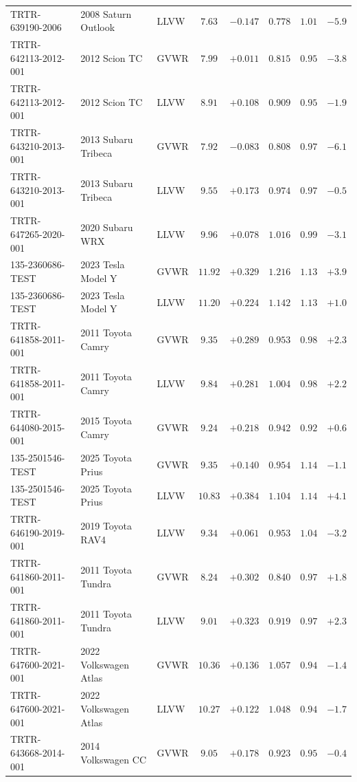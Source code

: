 {\begin{longtable}{lp{2.9cm}lccccc}
TRTR-639190-2006 & 2008 Saturn Outlook & LLVW & $7.63$ & $-0.147$ & $0.778$ & $1.01$ & $-5.9$\\
TRTR-642113-2012-001 & 2012 Scion TC & GVWR & $7.99$ & $+0.011$ & $0.815$ & $0.95$ & $-3.8$\\
TRTR-642113-2012-001 & 2012 Scion TC & LLVW & $8.91$ & $+0.108$ & $0.909$ & $0.95$ & $-1.9$\\
TRTR-643210-2013-001 & 2013 Subaru Tribeca & GVWR & $7.92$ & $-0.083$ & $0.808$ & $0.97$ & $-6.1$\\
TRTR-643210-2013-001 & 2013 Subaru Tribeca & LLVW & $9.55$ & $+0.173$ & $0.974$ & $0.97$ & $-0.5$\\
TRTR-647265-2020-001 & 2020 Subaru WRX & LLVW & $9.96$ & $+0.078$ & $1.016$ & $0.99$ & $-3.1$\\
135-2360686-TEST & 2023 Tesla Model Y & GVWR & $11.92$ & $+0.329$ & $1.216$ & $1.13$ & $+3.9$\\
135-2360686-TEST & 2023 Tesla Model Y & LLVW & $11.20$ & $+0.224$ & $1.142$ & $1.13$ & $+1.0$\\
TRTR-641858-2011-001 & 2011 Toyota Camry & GVWR & $9.35$ & $+0.289$ & $0.953$ & $0.98$ & $+2.3$\\
TRTR-641858-2011-001 & 2011 Toyota Camry & LLVW & $9.84$ & $+0.281$ & $1.004$ & $0.98$ & $+2.2$\\
TRTR-644080-2015-001 & 2015 Toyota Camry & GVWR & $9.24$ & $+0.218$ & $0.942$ & $0.92$ & $+0.6$\\
135-2501546-TEST & 2025 Toyota Prius & GVWR & $9.35$ & $+0.140$ & $0.954$ & $1.14$ & $-1.1$\\
135-2501546-TEST & 2025 Toyota Prius & LLVW & $10.83$ & $+0.384$ & $1.104$ & $1.14$ & $+4.1$\\
TRTR-646190-2019-001 & 2019 Toyota RAV4 & LLVW & $9.34$ & $+0.061$ & $0.953$ & $1.04$ & $-3.2$\\
TRTR-641860-2011-001 & 2011 Toyota Tundra & GVWR & $8.24$ & $+0.302$ & $0.840$ & $0.97$ & $+1.8$\\
TRTR-641860-2011-001 & 2011 Toyota Tundra & LLVW & $9.01$ & $+0.323$ & $0.919$ & $0.97$ & $+2.3$\\
TRTR-647600-2021-001 & 2022 Volkswagen Atlas & GVWR & $10.36$ & $+0.136$ & $1.057$ & $0.94$ & $-1.4$\\
TRTR-647600-2021-001 & 2022 Volkswagen Atlas & LLVW & $10.27$ & $+0.122$ & $1.048$ & $0.94$ & $-1.7$\\
TRTR-643668-2014-001 & 2014 Volkswagen CC & GVWR & $9.05$ & $+0.178$ & $0.923$ & $0.95$ & $-0.4$\\

\end{longtable}}
